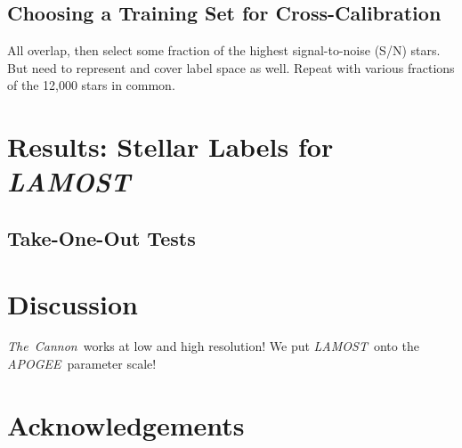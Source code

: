 \documentclass[12pt, preprint]{aastex}
\newcommand{\tc}{\textsl{The~Cannon}}
\newcommand{\apogee}{\textsl{APOGEE}}
\newcommand{\lamost}{\textsl{LAMOST}}
\begin{document}
\subsection{Choosing a Training Set for Cross-Calibration}

All overlap, then select some fraction of the highest signal-to-noise (S/N) 
stars. But need to represent and cover label space as well. Repeat with 
various fractions of the 12,000 stars in common.

\section{Results: Stellar Labels for \lamost}

\subsection{Take-One-Out Tests}

\section{Discussion}

\tc\ works at low and high resolution! We put \lamost\ onto the \apogee\ 
parameter scale!

\section{Acknowledgements}
\end{document}
